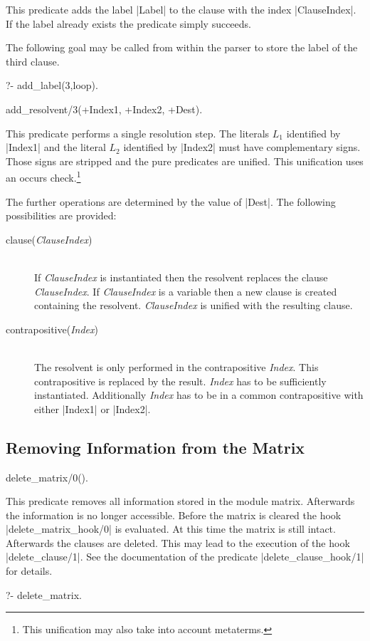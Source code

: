 This predicate adds the label |Label| to the clause with the index
|ClauseIndex|. If the label already exists the predicate simply succeeds.

The following goal may be called from within the parser to store the label of
the third clause.
\begin{BoxedSample}
  ?- add\_label(3,loop).
\end{BoxedSample}

\Predicate add_resolvent/3(+Index1, +Index2, +Dest).

This predicate performs a single resolution step. The literals $L_1$\/
identified by |Index1| and the literal $L_2$\/ identified by |Index2| must
have complementary signs. Those signs are stripped and the pure predicates are
unified. This unification uses an occurs check.\footnote{This unification may
  also take into account \eclipse{} metaterms.}

The further operations are determined by the value of |Dest|. The following
possibilities are provided:
\begin{description}
\item[clause({\em ClauseIndex}\/)]\ \\
  If {\em ClauseIndex}\/ is instantiated then the resolvent replaces the clause
  {\em ClauseIndex}. If {\em ClauseIndex}\/ is a variable then a new clause is
  created containing the resolvent. {\em ClauseIndex}\/ is unified with the
  resulting clause.
\item[contrapositive({\em Index}\/)]\ \\
  The resolvent is only performed in the contrapositive {\em Index}. This
  contrapositive is replaced by the result. {\em Index}\/ has to be
  sufficiently instantiated. Additionally {\em Index}\/ has to be in a common
  contrapositive with either |Index1| or |Index2|.
\end{description}




\subsection{Removing Information from the Matrix}


\Predicate delete_matrix/0().

This predicate removes all information stored in the module {\sf matrix}.
Afterwards the information is no longer accessible. Before the matrix is
cleared the hook |delete_matrix_hook/0| is evaluated. At this time the matrix
is still intact. Afterwards the clauses are deleted. This may lead to the
execution of the hook |delete_clause/1|. See the documentation of the
predicate |delete_clause_hook/1| for details.
\begin{BoxedSample}
  ?- delete\_matrix.
\end{BoxedSample}

